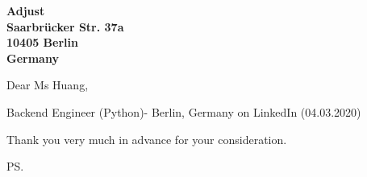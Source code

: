\documentclass[a4paper]{cover-letter}
\begin{document}
\longindentation=0pt

\newcommand{\companyName}{Adjust}

\begin{letter}{\bfseries \companyName\\Saarbrücker Str. 37a\\10405 Berlin\\Germany}


\date{Berlin, \today}

\opening{Dear Ms Huang,}{Backend Engineer (Python)- Berlin, Germany on LinkedIn (04.03.2020)}

%



%


\closing{ Thank you very much in advance for your consideration.}
\vspace{20pt}
\ps

\vspace{\fill}

\end{letter}
\end{document}
